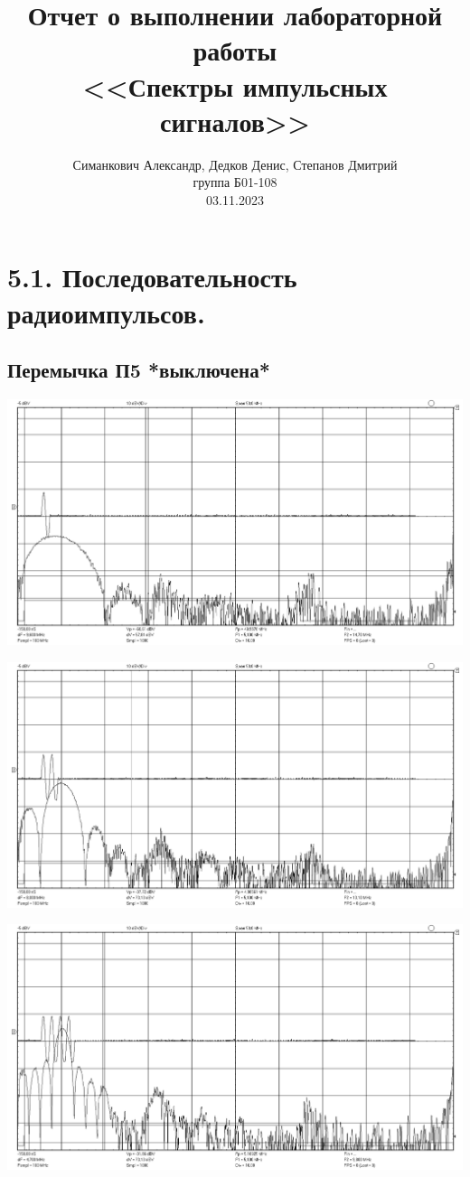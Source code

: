 \documentclass[12pt,a4paper]{article}
\author{\normalsize Симанкович Александр, Дедков Денис, Степанов Дмитрий
	\\ \normalsize группа Б01-108 \\
	\normalsize 03.11.2023}
\date{}
\title{
	\large Отчет о выполнении лабораторной работы \\
	\Large <<Спектры импульсных сигналов>> \\ 
	
}
\begin{document}
\maketitle
\newpage
\section*{5.1. Последовательность радиоимпульсов.}
\subsection*{Перемычка П5 *выключена*}
\vspace*{20pt}

\begin{center}
	\includegraphics[width=.8\linewidth]{data/51_n1_nop5}\hfill
\end{center}	
\begin{center}
	\includegraphics[width=.8\linewidth]{data/51_n2_nop5}\hfill
\end{center}	
\begin{center}
	\includegraphics[width=.8\linewidth]{data/51_n4_nop5}\hfill
\end{center}	
\end{document}
